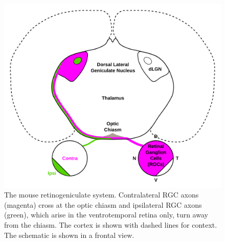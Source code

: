 \begin{figure}[H]
\begin{center}
\includegraphics[width=\textwidth]{figures/RGP_Schema.svg}
\caption{The mouse retinogeniculate system. Contralateral RGC axons (magenta) cross at the optic chiasm and ipsilateral RGC axons (green), which arise in the ventrotemporal retina only, turn away from the chiasm. The cortex is shown with dashed lines for context. The schematic is shown in a frontal view.}
\label{figures/RGP_Schema}
\end{center}
\end{figure}